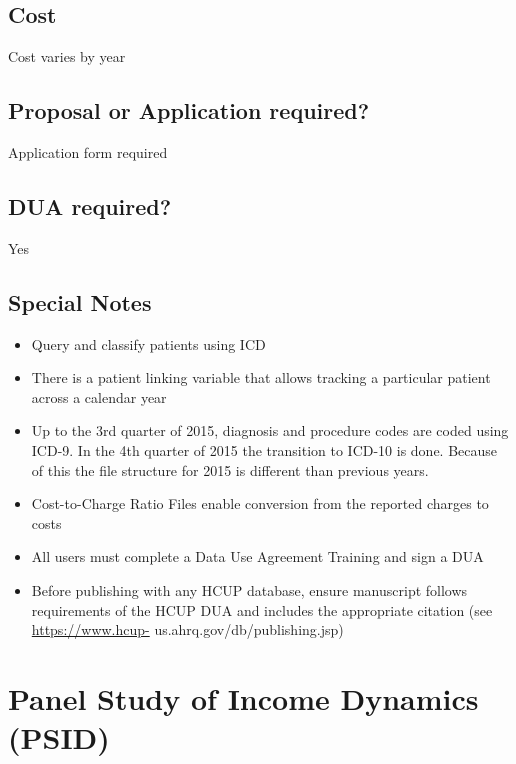 \documentclass[
]{book}
\providecommand{\tightlist}{%
  \setlength{\itemsep}{0pt}\setlength{\parskip}{0pt}}
\begin{document}
\hypertarget{cost-70}{%
\section{Cost}\label{cost-70}}

Cost varies by year

\hypertarget{proposal-or-application-required-70}{%
\section{Proposal or Application required?}\label{proposal-or-application-required-70}}

Application form required

\hypertarget{dua-required-70}{%
\section{DUA required?}\label{dua-required-70}}

Yes

\hypertarget{special-notes-70}{%
\section{Special Notes}\label{special-notes-70}}

\begin{itemize}
\tightlist
\item
  Query and classify patients using ICD
\item
  There is a patient linking variable that allows tracking a particular patient across a calendar year
\item
  Up to the 3rd quarter of 2015, diagnosis and procedure codes are coded using ICD-9. In the 4th quarter of 2015 the transition to ICD-10 is done. Because of this the file structure for 2015 is different than previous years.
\item
  Cost-to-Charge Ratio Files enable conversion from the reported charges to costs
\item
  All users must complete a Data Use Agreement Training and sign a DUA
\item
  Before publishing with any HCUP database, ensure manuscript follows requirements of the HCUP DUA and includes the appropriate citation (see \url{https://www.hcup-} us.ahrq.gov/db/publishing.jsp)
\end{itemize}

\mainmatter

\hypertarget{panel-study-of-income-dynamics-psid}{%
\chapter{Panel Study of Income Dynamics (PSID)}\label{panel-study-of-income-dynamics-psid}}
\end{document}
